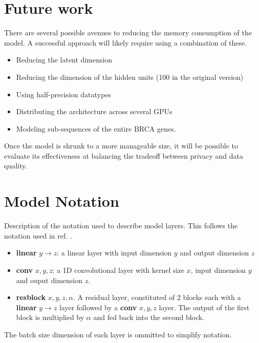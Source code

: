 \documentclass[11pt]{article}
\begin{document}
\section{Future work}

There are several possible avenues to reducing the memory consumption of the model.
A successful approach will likely require using a combination of these.
\begin{itemize}
    \item Reducing the latent dimension 
    \item Reducing the dimension of the hidden units (100 in the original version)
    \item Using half-precision datatypes
    \item Distributing the architecture across several GPUs
    \item Modeling sub-sequences of the entire BRCA genes.
\end{itemize}

Once the model is shrunk to a more manageable size, it will be possible to 
evaluate its effectiveness at balancing the tradeoff between privacy and data
quality.



    
\newpage

\appendix

\section{Model Notation}

Description of the notation used to describe model layers. This follows 
the notation used in ref. \cite{killoran2017generating}.
\begin{itemize}
    \item \textbf{linear} $y \rightarrow z$: a linear layer with 
    input dimension $y$ and output dimension $z$
    \item \textbf{conv} $x,y,z$: a 1D convolutional layer with kernel 
    size $x$, input dimension $y$ and ouput dimension $z$.
    \item \textbf{resblock} $x,y,z, \alpha$. A residual layer, constituted
    of 2 blocks each with a \textbf{linear} $y \rightarrow z$ layer followed
     by a \textbf{conv} $x,y,z$ layer. The output of the first block is 
    multiplied by $\alpha$ and fed back into the second block.
\end{itemize}

The batch size dimension of each layer is ommitted to simplify notation.


\end{document}
